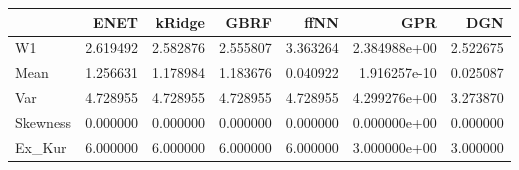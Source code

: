 \begin{tabular}{lrrrrrr}
\toprule
{} &      ENET &    kRidge &      GBRF &      ffNN &           GPR &       DGN \\
\midrule
W1       &  2.619492 &  2.582876 &  2.555807 &  3.363264 &  2.384988e+00 &  2.522675 \\
Mean     &  1.256631 &  1.178984 &  1.183676 &  0.040922 &  1.916257e-10 &  0.025087 \\
Var      &  4.728955 &  4.728955 &  4.728955 &  4.728955 &  4.299276e+00 &  3.273870 \\
Skewness &  0.000000 &  0.000000 &  0.000000 &  0.000000 &  0.000000e+00 &  0.000000 \\
Ex\_Kur   &  6.000000 &  6.000000 &  6.000000 &  6.000000 &  3.000000e+00 &  3.000000 \\
\bottomrule
\end{tabular}
